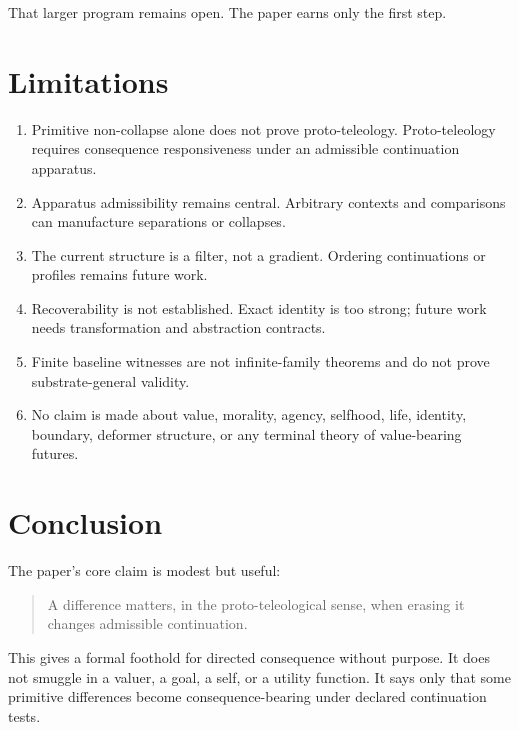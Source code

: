 \documentclass[11pt]{article}
\begin{document}
That larger program remains open. The paper earns only the first step.

\section{Limitations}

\begin{enumerate}[leftmargin=*]
  \item Primitive non-collapse alone does not prove proto-teleology.
  Proto-teleology requires consequence responsiveness under an admissible
  continuation apparatus.

  \item Apparatus admissibility remains central. Arbitrary contexts and
  comparisons can manufacture separations or collapses.

  \item The current structure is a filter, not a gradient. Ordering
  continuations or profiles remains future work.

  \item Recoverability is not established. Exact identity is too strong; future
  work needs transformation and abstraction contracts.

  \item Finite baseline witnesses are not infinite-family theorems and do not
  prove substrate-general validity.

  \item No claim is made about value, morality, agency, selfhood, life,
  identity, boundary, deformer structure, or any terminal theory of
  value-bearing futures.
\end{enumerate}

\section{Conclusion}

The paper's core claim is modest but useful:

\begin{quote}
A difference matters, in the proto-teleological sense, when erasing it changes
admissible continuation.
\end{quote}

This gives a formal foothold for directed consequence without purpose. It does
not smuggle in a valuer, a goal, a self, or a utility function. It says only
that some primitive differences become consequence-bearing under declared
continuation tests.
\end{document}
